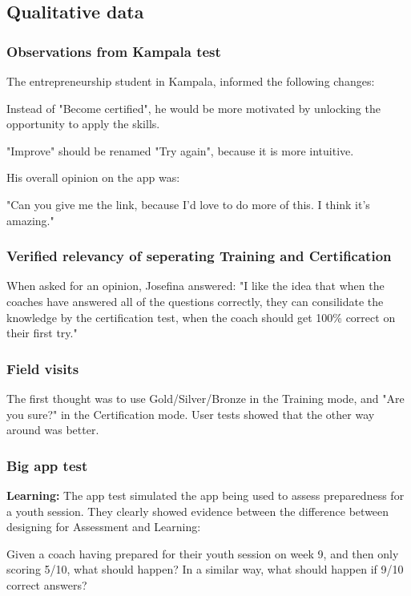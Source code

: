 \subsection{Qualitative data}


  \subsubsection{Observations from Kampala test}
  The entrepreneurship student in Kampala, informed the following changes:

  Instead of "Become certified", he would be more motivated by unlocking the opportunity to apply the skills.

  "Improve" should be renamed "Try again", because it is more intuitive.

  His overall opinion on the app was:

  "Can you give me the link, because I'd love to do more of this. I think it's amazing."

  \subsubsection{Verified relevancy of seperating Training and Certification}
  When asked for an opinion, Josefina answered: "I like the idea that when the coaches have answered all of the questions correctly, they can consilidate the knowledge by the certification test, when the coach should get 100\% correct on their first try."

  \subsubsection{Field visits}

  The first thought was to use Gold/Silver/Bronze in the Training mode, and "Are you sure?" in the Certification mode. User tests showed that the other way around was better.

  \subsubsection{Big app test}
  \textbf{Learning: } The app test simulated the app being used to assess preparedness for a youth session. They clearly showed evidence between the difference between designing for Assessment and Learning:

  Given a coach having prepared for their youth session on week 9, and then only scoring 5/10, what should happen? In a similar way, what should happen if 9/10 correct answers?

